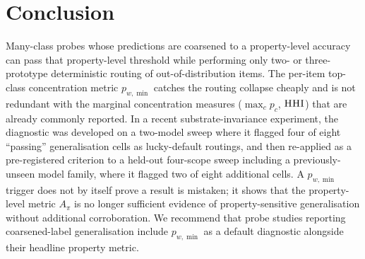 \documentclass[11pt,letterpaper]{article}
\newcommand{\pwmin}{\texorpdfstring{\ensuremath{p_{w,\min}}}{p\_(w,min)}}
\newcommand{\hhi}{\textsc{HHI}}
\begin{document}
\section{Conclusion}
\label{sec:conclusion}

Many-class probes whose predictions are coarsened to a
property-level accuracy can pass that property-level threshold while
performing only two- or three-prototype deterministic routing of
out-of-distribution items. The per-item top-class concentration
metric \pwmin{} catches the routing collapse cheaply and is not
redundant with the marginal concentration measures
($\max_c p_c$, $\hhi$) that are already commonly reported. In a
recent substrate-invariance experiment, the diagnostic was developed
on a two-model sweep where it flagged four of eight ``passing''
generalisation cells as lucky-default routings, and then re-applied
as a pre-registered criterion to a held-out four-scope sweep
including a previously-unseen model family, where it flagged two of
eight additional cells. A \pwmin{} trigger does not by itself prove
a result is mistaken; it shows that the property-level metric
$A_\pi$ is no longer sufficient evidence of property-sensitive
generalisation without additional corroboration. We recommend that
probe studies reporting coarsened-label generalisation include
\pwmin{} as a default diagnostic alongside their headline property
metric.



\end{document}

